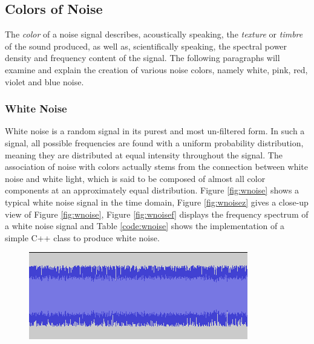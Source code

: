\documentclass[12pt,twoside]{report}
\begin{document}


\subsection{Colors of Noise}

The \emph{color} of a noise signal describes, acoustically speaking, the \emph{texture} or \emph{timbre} \footnotemark{} of the sound produced, as well as, scientifically speaking, the spectral power density and frequency content of the signal. The following paragraphs will examine and explain the creation of various noise colors, namely white, pink, red, violet and blue noise.


\subsubsection{White Noise}

White noise is a random signal in its purest and most un-filtered form. In such a signal, all possible frequencies are found with a uniform probability distribution, meaning they are distributed at equal intensity throughout the signal. The association of noise with colors actually stems from the connection between white noise and white light, which is said to be composed of almost all color components at an approximately equal distribution. Figure \ref{fig:wnoise} shows a typical white noise signal in the time domain, Figure \ref{fig:wnoisez} gives a close-up view of Figure \ref{fig:wnoise}, Figure \ref{fig:wnoisef} displays the frequency spectrum of a white noise signal and Table \ref{code:wnoise} shows the implementation of a simple C++ class to produce white noise.

\begin{figure}[h!]
  {\includegraphics[scale=0.62]{img/wnoise}}
\end{figure}
\end{document}
